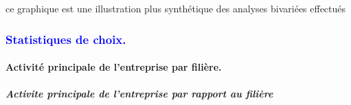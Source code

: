 \documentclass[
]{article}
\begin{document}
\hfill\break
ce graphique est une illustration plus synthétique des analyses
bivariées effectués

\textcolor{blue}{\subsubsection{Statistiques de choix.}}

\hypertarget{activituxe9-principale-de-lentreprise-par-filiuxe8re.}{%
\paragraph{Activité principale de l'entreprise par
filière.}\label{activituxe9-principale-de-lentreprise-par-filiuxe8re.}}

\hfill\break

\hypertarget{activite-principale-de-lentreprise-par-rapport-au-filiuxe8re}{%
\subparagraph{Activite principale de l'entreprise par rapport au
filière}\label{activite-principale-de-lentreprise-par-rapport-au-filiuxe8re}}

\hfill\break
\end{document}
